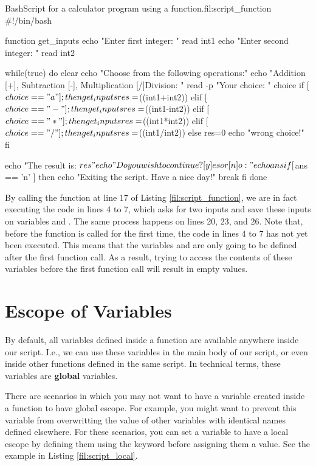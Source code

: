 \begin{source_code_float}{Bash}{Script for a calculator program using a function.}{fil:script_function}
#!/bin/bash

function get_inputs{
    echo "Enter first integer: " 
    read int1
    echo "Enter second integer: " 
    read int2
}

while(true)
do
    clear
    echo "Choose from the following operations:"
    echo "Addition [+], Subtraction [-], Multiplication [/]Division: "
    read -p "Your choice: " choice
    if [ $choice == "a" ] ; then
        get_inputs
        res=$((int1+int2))
     elif [ $choice == "-" ] ; then
        get_inputs
        res=$((int1-int2))
     elif [ $choice == "*" ] ; then
        get_inputs
        res=$((int1*int2))
    elif [ $choice == "/" ] ; then
        get_inputs
        res=$((int1/int2))
    else
        res=0
        echo "wrong choice!"
    fi

    echo "The result is:  $res"
    echo "Do you wish to continue? [y]es or [n]o: "
    echo  ans
    if [ $ans == 'n' ]
        then
         echo "Exiting the script. Have a nice day!"
        break
    fi
done
\end{source_code_float}
By calling the  function at line 17 of Listing \ref{fil:script_function}, we are in fact executing the code in lines 4 to 7, which asks for two inputs and save these inputs on variables  and . The same process happens on lines 20, 23, and 26. Note that, before the function  is called for the first time, the code in lines 4 to 7 has not yet been executed. This means that the variables  and  are only going to be defined after the first function call. As a result, trying to access the contents of these variables before the first function call will result in empty values.

\section{Escope of Variables}
By default, all variables defined inside a function are available anywhere inside our script. I.e., we can use these variables in the main body of our script, or even inside other functions defined in the same script. In technical terms, these variables are \textbf{global} variables.

There are scenarios in which you may not want to have a variable created inside a function to have global escope. For example,  you might want to prevent this variable from overwritting the value of other variables with identical names defined elsewhere. For these scenarios, you can set a variable to have a local escope by defining them using the  keyword before assigning them a value. See the example in Listing \ref{fil:script_local}.

